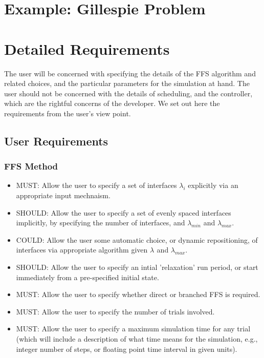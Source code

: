 \documentclass[11pt]{article}
\begin{document}
\section{Example: Gillespie Problem}




\section{Detailed Requirements}

The user will be concerned with specifying the details of the FFS
algorithm and related choices, and the particular parameters for
the simulation at hand. The user should not be concerned with the
details of scheduling, and the controller, which are the rightful
concerns of the developer. We set out here the requirements from
the user's view point.

\subsection{User Requirements}

\subsubsection{FFS Method}
\begin{itemize}
\item
MUST: Allow the user to specify a set of interfaces $\lambda_i$ explicitly
via an appropriate input mechnaism.
\item
SHOULD: Allow the user to specify a set of evenly spaced interfaces
implicitly, by specifying the number of interfaces, and $\lambda_{min}$
and $\lambda_{max}$.
\item
COULD: Allow the user some automatic choice, or dynamic repositioning, of
interfaces via appropriate algorithm given $\lambda_{}$ and $\lambda_{max}$.
\item
SHOULD: Allow the user to specify an intial 'relaxation' run period, or
start immediately from a pre-specified initial state.
\item
MUST: Allow the user to specify whether direct or branched FFS is required.
\item
MUST: Allow the user to specify the number of trials involved.
\item
MUST: Allow the user to specify a maximum simulation time for any trial
(which will include a description of what time means for the simulation,
e.g., integer number of steps, or floating point time interval in given
units).
\end{itemize}
\end{document}
